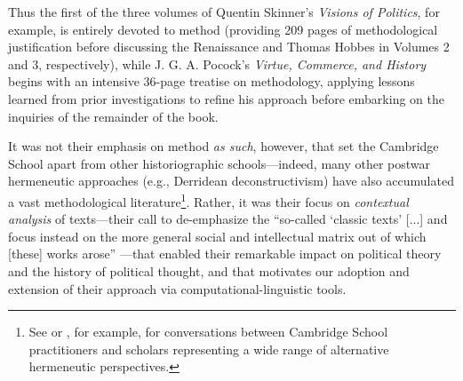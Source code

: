 \documentclass[11pt]{article}
\begin{document}
Thus the first of the three volumes of Quentin Skinner's \textit{Visions of Politics}, for example, is entirely devoted to method (providing 209 pages of methodological justification before discussing the Renaissance and Thomas Hobbes in Volumes 2 and 3, respectively), while J. G. A. Pocock's \textit{Virtue, Commerce, and History} begins with an intensive 36-page treatise on methodology, applying lessons learned from prior investigations to refine his approach before embarking on the inquiries of the remainder of the book.

It was not their emphasis on method \textit{as such}, however, that set the Cambridge School apart from other historiographic schools---indeed, many other postwar hermeneutic approaches (e.g., Derridean deconstructivism) have also accumulated a vast methodological literature\footnote{See \cite{skinner_return_1990} or \cite{tully_meaning_1988}, for example, for conversations between Cambridge School practitioners and scholars representing a wide range of alternative hermeneutic perspectives.}. Rather, it was their focus on \textit{contextual analysis} of texts---their call to de-emphasize the ``so-called `classic texts'{} [...] and focus instead on the more general social and intellectual matrix out of which [these] works arose'' \citep[p. x]{skinner_foundations_1978a}---that enabled their remarkable impact on political theory and the history of political thought, and that motivates our adoption and extension of their approach via computational-linguistic tools.


\end{document}
